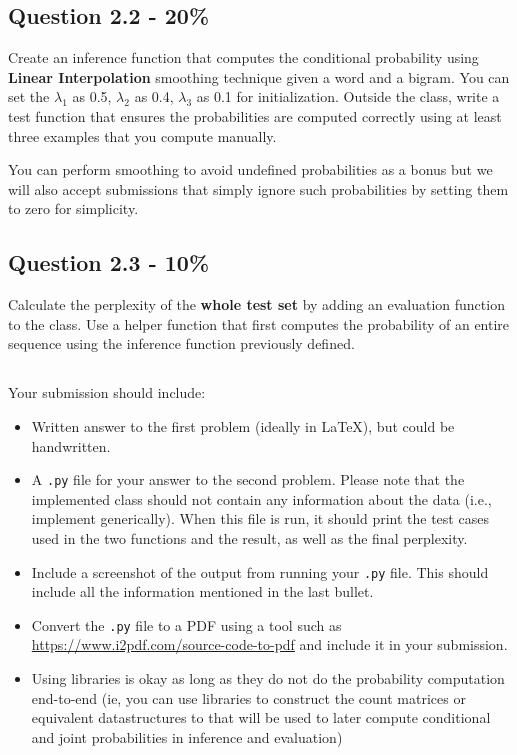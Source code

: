 \documentclass{article}
\newcommand{\answerbox}{
    \vspace{7cm} %
}
\begin{document}
\subsection*{Question 2.2 - 20\%}
Create an inference function that computes the conditional probability using \textbf{Linear Interpolation} smoothing technique given a word and a bigram.
You can set the $\lambda_1$ as 0.5, $\lambda_2$ as 0.4, $\lambda_3$ as 0.1 for initialization. Outside the class, write a test function that ensures the probabilities are computed correctly using at least three examples that you compute manually.
\answerbox

You can perform smoothing to avoid undefined probabilities as a bonus but we will also accept submissions that simply ignore such probabilities by setting them to zero for simplicity.


\subsection*{Question 2.3 - 10\%}
Calculate the perplexity of the \textbf{whole test set} by adding an evaluation function to the class. Use a helper function that first computes the probability of an entire sequence using the inference function previously defined.


\subsection*{}

\begin{tcolorbox}[colframe=orange!50!black, colback=orange!10, coltitle=black]
Your submission should include:
\begin{itemize}
    \item Written answer to the first problem (ideally in LaTeX), but could be handwritten.
    \item A \texttt{.py} file for your answer to the second problem. Please note that the implemented class should not contain any information about the data (i.e., implement generically). When this file is run, it should print the test cases used in the two functions and the result, as well as the final perplexity.
    \item Include a screenshot of the output from running your \texttt{.py} file. This should include all the information mentioned in the last bullet.
    \item Convert the \texttt{.py} file to a PDF using a tool such as \url{https://www.i2pdf.com/source-code-to-pdf} and include it in your submission.
    \item Using libraries is okay as long as they do not do the probability computation end-to-end (ie, you can use libraries to construct the count matrices or equivalent datastructures to that will be used to later compute conditional and joint probabilities in inference and evaluation)
\end{itemize}
\end{tcolorbox}
\end{document}
